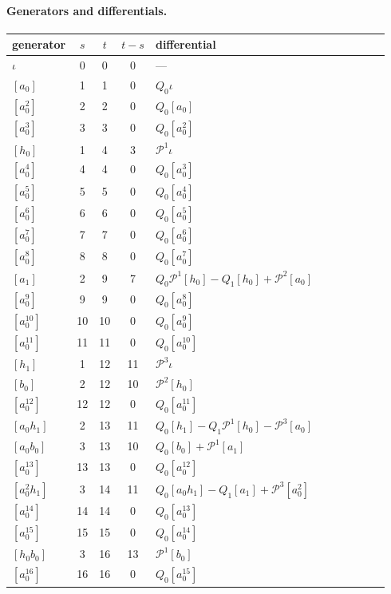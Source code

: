 \documentclass[11pt]{article}
\renewcommand{\P}{\mathcal{P}}
\begin{document}
\paragraph{Generators and differentials.}
\begin{center}\small
\begin{longtable}{lccc>{\raggedright\arraybackslash}p{0.62\linewidth}}
\toprule
generator & $s$ & $t$ & $t-s$ & differential \\
\midrule\endhead
$\iota$ & 0 & 0 & 0 & --- \\
$[a_0]$ & 1 & 1 & 0 & $Q_{0}\iota$ \\
$[a_0^2]$ & 2 & 2 & 0 & $Q_{0}[a_0]$ \\
$[a_0^3]$ & 3 & 3 & 0 & $Q_{0}[a_0^2]$ \\
$[h_0]$ & 1 & 4 & 3 & $\P^{1}\iota$ \\
$[a_0^4]$ & 4 & 4 & 0 & $Q_{0}[a_0^3]$ \\
$[a_0^5]$ & 5 & 5 & 0 & $Q_{0}[a_0^4]$ \\
$[a_0^6]$ & 6 & 6 & 0 & $Q_{0}[a_0^5]$ \\
$[a_0^7]$ & 7 & 7 & 0 & $Q_{0}[a_0^6]$ \\
$[a_0^8]$ & 8 & 8 & 0 & $Q_{0}[a_0^7]$ \\
$[a_1]$ & 2 & 9 & 7 & $Q_{0}\P^{1}[h_0] - Q_{1}[h_0] + \P^{2}[a_0]$ \\
$[a_0^9]$ & 9 & 9 & 0 & $Q_{0}[a_0^8]$ \\
$[a_0^{10}]$ & 10 & 10 & 0 & $Q_{0}[a_0^9]$ \\
$[a_0^{11}]$ & 11 & 11 & 0 & $Q_{0}[a_0^{10}]$ \\
$[h_1]$ & 1 & 12 & 11 & $\P^{3}\iota$ \\
$[b_0]$ & 2 & 12 & 10 & $\P^{2}[h_0]$ \\
$[a_0^{12}]$ & 12 & 12 & 0 & $Q_{0}[a_0^{11}]$ \\
$[a_0h_1]$ & 2 & 13 & 11 & $Q_{0}[h_1] - Q_{1}\P^{1}[h_0] - \P^{3}[a_0]$ \\
$[a_0b_0]$ & 3 & 13 & 10 & $Q_{0}[b_0] + \P^{1}[a_1]$ \\
$[a_0^{13}]$ & 13 & 13 & 0 & $Q_{0}[a_0^{12}]$ \\
$[a_0^2h_1]$ & 3 & 14 & 11 & $Q_{0}[a_0h_1] - Q_{1}[a_1] + \P^{3}[a_0^2]$ \\
$[a_0^{14}]$ & 14 & 14 & 0 & $Q_{0}[a_0^{13}]$ \\
$[a_0^{15}]$ & 15 & 15 & 0 & $Q_{0}[a_0^{14}]$ \\
$[h_0b_0]$ & 3 & 16 & 13 & $\P^{1}[b_0]$ \\
$[a_0^{16}]$ & 16 & 16 & 0 & $Q_{0}[a_0^{15}]$ \\

\end{longtable}
\end{center}
\end{document}
